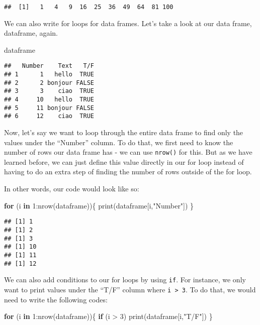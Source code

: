 \documentclass[
]{book}
\newenvironment{Shaded}{\begin{snugshade}}{\end{snugshade}}
\newcommand{\ControlFlowTok}[1]{\textcolor[rgb]{0.13,0.29,0.53}{\textbf{#1}}}
\newcommand{\DecValTok}[1]{\textcolor[rgb]{0.00,0.00,0.81}{#1}}
\newcommand{\FunctionTok}[1]{\textcolor[rgb]{0.00,0.00,0.00}{#1}}
\newcommand{\NormalTok}[1]{#1}
\newcommand{\SpecialCharTok}[1]{\textcolor[rgb]{0.00,0.00,0.00}{#1}}
\newcommand{\StringTok}[1]{\textcolor[rgb]{0.31,0.60,0.02}{#1}}
\begin{document}
\begin{verbatim}
##  [1]   1   4   9  16  25  36  49  64  81 100
\end{verbatim}

We can also write for loops for data frames. Let's take a look at our data frame, dataframe, again.

\begin{Shaded}
\begin{Highlighting}[]
\NormalTok{dataframe}
\end{Highlighting}
\end{Shaded}

\begin{verbatim}
##   Number    Text   T/F
## 1      1   hello  TRUE
## 2      2 bonjour FALSE
## 3      3    ciao  TRUE
## 4     10   hello  TRUE
## 5     11 bonjour FALSE
## 6     12    ciao  TRUE
\end{verbatim}

Now, let's say we want to loop through the entire data frame to find only the values under the ``Number'' column. To do that, we first need to know the number of rows our data frame has - we can use \texttt{nrow()} for this. But as we have learned before, we can just define this value directly in our for loop instead of having to do an extra step of finding the number of rows outside of the for loop.

In other words, our code would look like so:

\begin{Shaded}
\begin{Highlighting}[]
\ControlFlowTok{for}\NormalTok{ (i }\ControlFlowTok{in} \DecValTok{1}\SpecialCharTok{:}\FunctionTok{nrow}\NormalTok{(dataframe))\{}
  \FunctionTok{print}\NormalTok{(dataframe[i,}\StringTok{"Number"}\NormalTok{])}
\NormalTok{\}}
\end{Highlighting}
\end{Shaded}

\begin{verbatim}
## [1] 1
## [1] 2
## [1] 3
## [1] 10
## [1] 11
## [1] 12
\end{verbatim}

We can also add conditions to our for loops by using \texttt{if}. For instance, we only want to print values under the ``T/F'' column where \texttt{i\ \textgreater{}\ 3}. To do that, we would need to write the following codes:

\begin{Shaded}
\begin{Highlighting}[]
\ControlFlowTok{for}\NormalTok{ (i }\ControlFlowTok{in} \DecValTok{1}\SpecialCharTok{:}\FunctionTok{nrow}\NormalTok{(dataframe))\{}
  \ControlFlowTok{if}\NormalTok{ (i }\SpecialCharTok{\textgreater{}} \DecValTok{3}\NormalTok{) }\FunctionTok{print}\NormalTok{(dataframe[i,}\StringTok{"T/F"}\NormalTok{])}
\NormalTok{\}}
\end{Highlighting}
\end{Shaded}
\end{document}
